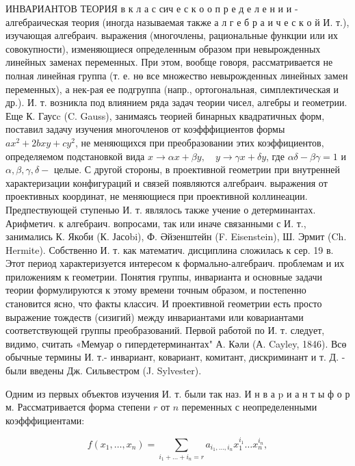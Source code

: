 \documentclass[10pt]{article}
\begin{document}
ИНВАРИАНТОВ ТЕОРИЯ в к л а с сич е с к о о п р е д е л е н и и - алгебраическая теория (иногда называемая также а л г е б р а и ч е с к о й И. т.), изучающая алгебраич. выражения (многочлены, рациональные функции или их совокупности), изменяющиеся определенным образом при невырожденных линейных заменах переменных. При этом, вообще говоря, рассматривается не полная линейная группа (т. е. нө все множество невырожденных линейных замен переменных), а нек-рая ее подгруппа (напр., ортогональная, симплектическая и др.). И. т. возникла под влиянием ряда задач теории чисел, алгебры и геометрии. Еще К. Гаусc (C. Gauss), занимаясь теорией бинарных квадратичных форм, поставил задачу изучения многочленов от коэфффициентов формы $a x^{2}+2 b x y+c y^{2}$, не меняющихся при преобразовании этих коэффициентов, определяемом подстановкой вида $x \rightarrow \alpha x+\beta y, \quad y \rightarrow \gamma x+\delta y$, где $\alpha \delta-\beta \gamma=1$ и $\alpha, \beta, \gamma, \delta-$ целые. С другой стороны, в проективной геометрии при внутренней характеризации конфигураций и связей появляются алгебраич. выражения от проективных координат, не меняющиеся при проективной коллинеации. Предпествующей ступенью И. т. являлось также учение о детерминантах. Арифметич. к алгебраич. вопросами, так или иначе связанными с И. т., занимались К. Якоби (К. Јасоbi), Ф. Әйзенштейн (F. Eisenstein), Ш. Эрмит (Ch. Hermite). Собственно И. т. как математич. дисциплина сложилась к сер. 19 в. Этот период характеризуется интересом к формально-алгебраич. проблемам и их приложениям к геометрии. Понятия группы, инварианта и основные задачи теории формулируются к этому времени точным образом, и постепенно становится ясно, что факты классич. И проективной геометрии есть просто выражение тождеств (сизигий) между инвариантами или ковариантами соответствующей группы преобразований. Первой работой по И. т. следует, видимо, считать «Мемуар о гипердетерминантах" А. Кәли (А. Cayley, 1846). Всө обычные термины И. т.- инвариант, ковариант, комитант, дискриминант и т. Д. - были введены Дж. Сильвестром (J. Sylvester).



Одним из первых объектов изучения И. т. были так наз. И н в а $\mathrm{p}$ и а н т ы ф о р м. Рассматривается форма степени $r$ от $n$ переменных с неопределенными коэфффициентами:



\[

f\left(x_{1}, \ldots, x_{n}\right)=\sum_{i_{1}+\ldots+i_{n}=r} a_{i_{1}, \ldots, i_{n}} x_{1}^{i_{1}} \ldots x_{n}^{i_{n}},

\]
\end{document}
